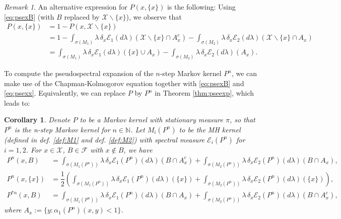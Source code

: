 \documentclass[12pt,a4]{amsart}
\numberwithin{equation}{section}
\theoremstyle{plain}
\newtheorem{corollary}{Corollary}[section]
\theoremstyle{definition}
\theoremstyle{remark}
\newtheorem{rk}{Remark}[section]
\newcommand{\1}{\mathds{1}}
\begin{document}
\begin{rk}
 An alternative expression for $P(x,\{x\})$ is the following: Using \eqref{eq:psexB} (with $B$ replaced by $\mathcal{X} \backslash \{x\}$), we observe that
		\begin{align*}
		P(x,\{x\}) &= 1 - P(x,\mathcal{X} \backslash \{x\}) \\
		&=1 - \int_{\sigma(M_1)} \lambda \, \delta_x \mathcal{E}_1(d \lambda) (\mathcal{X} \backslash \{x\} \cap A_x^c) -  \int_{\sigma(M_2)} \lambda \, \delta_x \mathcal{E}_2(d \lambda) (\mathcal{X} \backslash \{x\} \cap A_x) \\
		&= \int_{\sigma(M_1)} \lambda \, \delta_x \mathcal{E}_1(d \lambda) (\{x\} \cup A_x) -  \int_{\sigma(M_2)} \lambda \, \delta_x \mathcal{E}_2(d \lambda) (A_x).
		\end{align*}

\end{rk}
	
	To compute the pseudospectral expansion of the $n$-step Markov kernel $P^n$, we can make use of the Chapman-Kolmogorov equation together with \eqref{eq:psexB} and \eqref{eq:psexx}. Equivalently, we can replace $P$ by $P^n$ in Theorem \ref{thm:pseexp}, which leads to:
		
	\begin{corollary}
		Denote $P$ to be a Markov kernel with stationary measure $\pi$, so that $P^n$ is the n-step Markov kernel for $n \in \mathbb{N}$. Let $M_i(P^n)$ to be the MH kernel (defined in def. \ref{def:M1} and def. \ref{def:M2}) with spectral measure $\mathcal{E}_i(P^n)$ for $i= 1,2$. For $x \in \mathcal{X}$, $B \in \mathcal{F}$ with $x \notin B$, we have
				\begin{align}
					P^n(x,B) &= \int_{\sigma(M_1(P^n))} \lambda \, \delta_x \mathcal{E}_1(P^n)(d \lambda) (B \cap A_x^c) +  \int_{\sigma(M_2(P^n))} \lambda \, \delta_x \mathcal{E}_2(P^n)(d \lambda) (B \cap A_x), \label{eq:pnsexB}\\
					P^n(x,\{x\}) &= \dfrac{1}{2} \left( \int_{\sigma(M_1(P^n))} \lambda \, \delta_x \mathcal{E}_1(P^n)(d \lambda) (\{x\} ) + \int_{\sigma(M_2(P^n))} \lambda \, \delta_x \mathcal{E}_2(P^n)(d \lambda) (\{x\}) \right) \label{eq:pnsexx}, \\
					P^{*n}(x,B) &= \int_{\sigma(M_1(P^n))} \lambda \, \delta_x \mathcal{E}_1(P^n)(d \lambda) (B \cap A_x) + \int_{\sigma(M_2(P^n))} \lambda \, \delta_x \mathcal{E}_2(P^n)(d \lambda) (B \cap A_x^c), \label{eq:p*nsexB}	
				\end{align}
				where $A_x := \{y : \alpha_1(P^n)(x,y) < 1\} $.
		\end{corollary}
\end{document}
